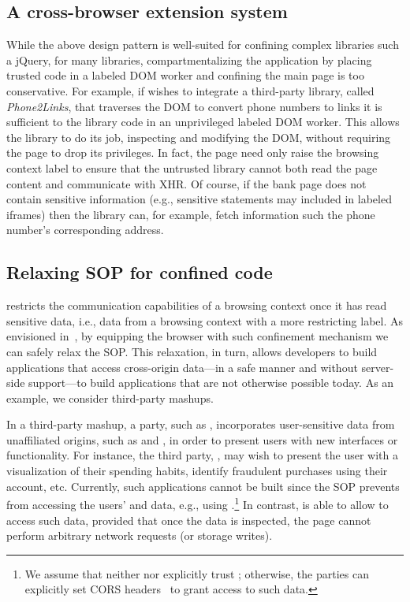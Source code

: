 \subsection{A cross-browser extension system}
\label{sec:system:extension}

While the above design pattern is well-suited for confining complex libraries
such a jQuery, for many libraries, compartmentalizing the application by
placing trusted code in a labeled DOM worker and confining the main page is too
conservative.
%
For example, if  wishes to integrate a third-party library,
called \emph{Phone2Links}, that traverses the DOM to convert phone numbers to
links it is sufficient to the library code in an unprivileged labeled DOM worker.
%
This allows the library to do its job, inspecting and modifying the DOM,
without requiring the page to drop its privileges.
%
In fact, the page need only raise the browsing context label to ensure that the
untrusted library cannot both read the page content and communicate with
XHR.
%
Of course, if the bank page does not contain sensitive information (e.g.,
sensitive statements may included in labeled iframes) then the library can, for
example, fetch information such the phone number's corresponding address.

\subsection{Relaxing SOP for confined code}
\label{sec:system:mashup}
%
\sys{} restricts the communication capabilities of a browsing context
once it has read sensitive data, i.e., data from a browsing context
with a more restricting label.
%
As envisioned in~\cite{yang:2013:towards}, by equipping the browser with such
confinement mechanism we can safely relax the SOP.
%
This relaxation, in turn, allows developers to build applications that access
cross-origin data---in a safe manner and without server-side support---to build
applications that are not otherwise possible today.
%
As an example, we consider third-party mashups.

In a third-party mashup, a party, such as ,
incorporates user-sensitive data from unaffiliated origins, such as
 and , in order to present users with new
interfaces or functionality.
%
For instance, the third party, , may wish to present the user with a
visualization of their spending habits, identify fraudulent
 purchases using their  account, etc.
%
Currently, such applications cannot be built since the SOP prevents
 from accessing the users'  and
 data, e.g., using \xhr{}.\footnote{
 We assume that neither  nor 
 explicitly trust ; otherwise, the parties can
 explicitly set CORS headers~\cite{cors13} to grant 
 access to such data.
}
%
In contrast, \sys{} is able to allow  to access such
data, provided that once the data is inspected, the page cannot
perform arbitrary network requests (or storage writes).
 
